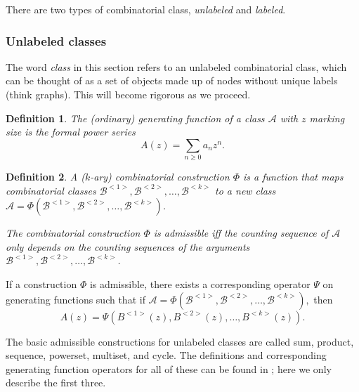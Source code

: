 \documentclass[12pt]{article}
\theoremstyle{plain}
\newtheorem{defin}{Definition}
\begin{document}
There are two types of combinatorial class, \emph{unlabeled} and \emph{labeled}.

\subsubsection{Unlabeled classes}
The word \emph{class} in this section refers to an unlabeled combinatorial class, which can be thought of as a set of objects made up of nodes without unique labels (think graphs).
This will become rigorous as we proceed.

\begin{defin}
The (ordinary) \emph{generating function} of a class \(\mathcal{A}\) with \(z\) marking size is the formal power series
\[ A(z) = \sum_{n \geq 0} a_n z^n.\]
\end{defin}
\begin{defin}
A (\(k\)-ary) \emph{combinatorial construction} \(\Phi\) is a function that maps combinatorial classes \(\mathcal{B}^{<1>}, \mathcal{B}^{<2>}, \dots, \mathcal{B}^{<k>}\) to a new class \(\mathcal{A} = \Phi(\mathcal{B}^{<1>}, \mathcal{B}^{<2>}, \dots, \mathcal{B}^{<k>}) \).

The combinatorial construction \( \Phi \) is \emph{admissible} iff the counting sequence of \( \mathcal{A} \) only depends on the counting sequences of the arguments \( \mathcal{B}^{<1>}, \mathcal{B}^{<2>}, \dots, \mathcal{B}^{<k>} \).
\end{defin}

If a construction \( \Phi \) is admissible, there exists a corresponding operator \(\Psi\) on generating functions such that if
\(\mathcal{A} = \Phi(\mathcal{B}^{<1>}, \mathcal{B}^{<2>}, \dots, \mathcal{B}^{<k>}), \)
 then
\[A(z) = \Psi(B^{<1>}(z), B^{<2>}(z), \dots, B^{<k>}(z) ). \]

The basic admissible constructions for unlabeled classes are called sum, product, sequence, powerset, multiset, and cycle.
The definitions and corresponding generating function operators for all of these can be found in \cite{ac}; here we only describe the first three.
\end{document}
